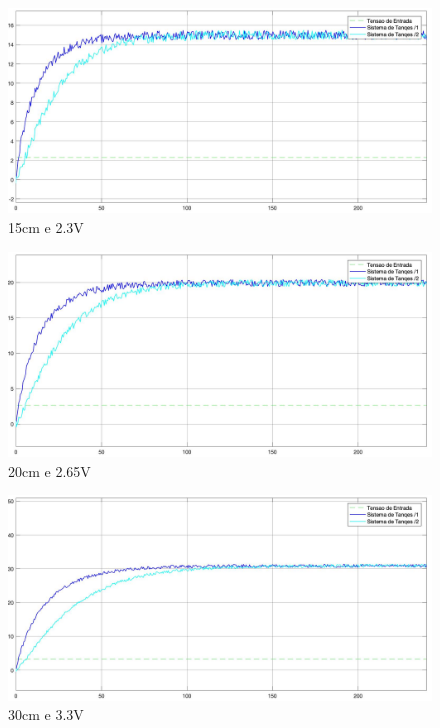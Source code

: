 \documentclass[a4paper,12pt]{article}
\begin{document}
\begin{figure}[H]
	\centering
	\includegraphics[scale=0.20]{./imagens/exp2/L15.jpg}
	\caption{15cm e 2.3V}
\end{figure}

\begin{figure}[H]
	\centering
	\includegraphics[scale=0.20]{./imagens/exp2/L20.jpg}
	\caption{20cm e 2.65V}
\end{figure}

\begin{figure}[H]
	\centering
	\includegraphics[scale=0.20]{./imagens/exp2/L30.jpg}
	\caption{30cm e 3.3V}
\end{figure}
\end{document}

